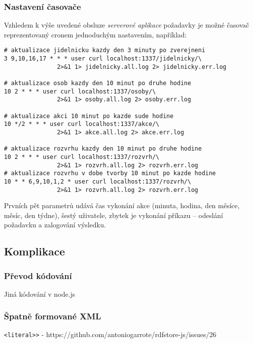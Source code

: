 \subsubsection{Nastavení časovače}
Vzhledem k výše uvedené obsluze \textit{serverové aplikace}  požadavky je možné časovač reprezentovaný cronem jednoduchým nastavením, například:
\begin{verbatim}
# aktualizace jidelnicku kazdy den 3 minuty po zverejneni
3 9,10,16,17 * * * user curl localhost:1337/jidelnicky/\
               2>&1 1> jidelnicky.all.log 2> jidelnicky.err.log

# aktualizace osob kazdy den 10 minut po druhe hodine
10 2 * * * user curl localhost:1337/osoby/\
               2>&1 1> osoby.all.log 2> osoby.err.log

# aktualizace akci 10 minut po kazde sude hodine
10 */2 * * * user curl localhost:1337/akce/\
               2>&1 1> akce.all.log 2> akce.err.log

# aktualizace rozvrhu kazdy den 10 minut po druhe hodine
10 2 * * * user curl localhost:1337/rozvrh/\
               2>&1 1> rozvrh.all.log 2> rozvrh.err.log
# aktualizace rozvrhu v dobe tvorby 10 minut po kazde hodine
10 * * 6,9,10,1,2 * user curl localhost:1337/rozvrh/\
               2>&1 1> rozvrh.all.log 2> rozvrh.err.log
\end{verbatim}
Prvních pět parametrů udává čas vykonání akce (minuta, hodina, den měsíce, měsíc, den týdne), šestý uživatele, zbytek je vykonání příkazu -- odeslání požadavku a zalogování výsledku.


\subsection{Komplikace}

\subsubsection{Převod kódování}
Jiná kódování v node.js

\subsubsection{Špatně formované XML}
\verb|<literal>>| - https://github.com/antoniogarrote/rdfstore-js/issues/26

